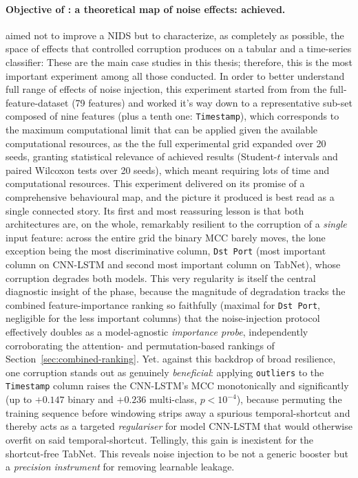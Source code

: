 \documentclass[../main.tex]{subfiles}
\begin{document}
\paragraph{Objective of : a theoretical map of noise effects: achieved.\newline}
 aimed not to improve a NIDS but to characterize, as completely as possible, the space of effects that controlled corruption produces on a tabular and a time-series classifier: These are the main case studies in this thesis; therefore, this is the most important experiment among all those conducted. In order to better understand full range of effects of noise injection, this experiment started from from the full-feature-dataset (79 features) and worked it's way down to a representative sub-set composed of nine features (plus a tenth one: \texttt{Timestamp}), which corresponds to the maximum computational limit that can be applied given the available computational resources, as the the full experimental grid expanded over 20 seeds, granting statistical relevance of achieved results (Student-$t$ intervals and paired Wilcoxon tests over 20 seeds), which meant requiring lots of time and computational resources. 
This experiment delivered on its promise of a comprehensive behavioural map, and the picture it produced is best read as a single connected story. Its first and most reassuring lesson is that both architectures are, on the whole, remarkably resilient to the corruption of a \emph{single} input feature: across the entire grid the binary MCC barely moves, the lone exception being the most discriminative column, \texttt{Dst Port} (most important column on CNN-LSTM and second most important column on TabNet), whose corruption degrades both models. This very regularity is itself the central diagnostic insight of the phase, because the magnitude of degradation tracks the combined feature-importance ranking so faithfully (maximal for \texttt{Dst Port}, negligible for the less important columns) that the noise-injection protocol effectively doubles as a model-agnostic \emph{importance probe}, independently corroborating the attention- and permutation-based rankings of Section~\ref{sec:combined-ranking}. Yet. against this backdrop of broad resilience, one corruption stands out as genuinely \emph{beneficial}: applying \texttt{outliers} to the \texttt{Timestamp} column raises the CNN-LSTM's MCC monotonically and significantly (up to $+0.147$ binary and $+0.236$ multi-class, $p<10^{-4}$), because permuting the training sequence before windowing strips away a spurious temporal-shortcut and thereby acts as a targeted \emph{regulariser} for model CNN-LSTM that would otherwise overfit on said temporal-shortcut. Tellingly, this gain is inexistent for the shortcut-free TabNet. This reveals noise injection to be not a generic booster but a \emph{precision instrument} for removing learnable leakage.
\end{document}
